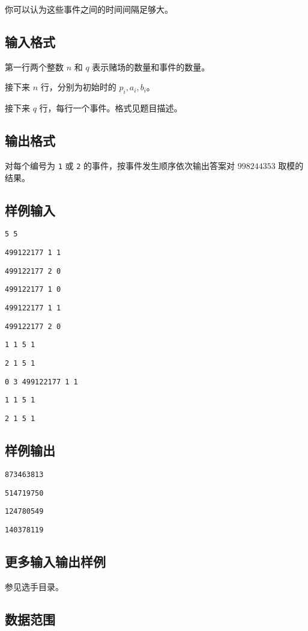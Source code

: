 \documentclass[UTF8]{article}
\begin{document}
你可以认为这些事件之间的时间间隔足够大。

\subsection{输入格式}

第一行两个整数 $n$ 和 $q$ 表示赌场的数量和事件的数量。

接下来 $n$ 行，分别为初始时的 $p_i,a_i,b_i$。

接下来 $q$ 行，每行一个事件。格式见题目描述。

\subsection{输出格式}

对每个编号为 \texttt{1} 或 \texttt{2} 的事件，按事件发生顺序依次输出答案对 $998244353$ 取模的结果。

\subsection{样例输入}

	\texttt{5 5}
	
	\texttt{499122177 1 1}
	
	\texttt{499122177 2 0}
	
	\texttt{499122177 1 0}
	
	\texttt{499122177 1 1}
	
	\texttt{499122177 2 0}
	
	\texttt{1 1 5 1}
	
	\texttt{2 1 5 1}
	
	\texttt{0 3 499122177 1 1}
	
	\texttt{1 1 5 1}
	
	\texttt{2 1 5 1}

\subsection{样例输出}

	\texttt{873463813}
	
	\texttt{514719750}
	
	\texttt{124780549}
	
	\texttt{140378119}

\subsection{更多输入输出样例}
	参见选手目录。

\subsection{数据范围}
\end{document}
